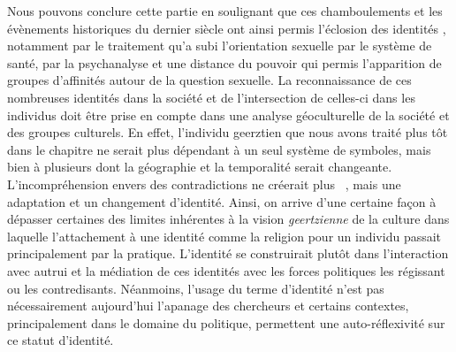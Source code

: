 Nous pouvons conclure cette partie en soulignant que ces chamboulements et les évènements historiques du dernier siècle ont ainsi permis l'éclosion des identités \lgbt{}, notamment par le traitement qu'a subi l'orientation sexuelle par le système de santé, par la psychanalyse et une distance du pouvoir qui permis l'apparition de groupes d'affinités autour de la question sexuelle. 
La reconnaissance de ces nombreuses identités dans la société et de l'intersection de celles-ci dans les individus doit être prise en compte dans une analyse géoculturelle de la société et des groupes culturels.
En effet, l'individu geerztien que nous avons traité plus tôt dans le chapitre ne serait plus dépendant à un seul système de symboles, mais bien à plusieurs dont la géographie et la temporalité serait changeante.
L'incompréhension envers des contradictions ne créerait plus ~\citep[33]{Geertz1972}, mais une adaptation et un changement d'identité.
Ainsi, on arrive d'une certaine façon à dépasser certaines des limites inhérentes à la vision \emph{geertzienne} de la culture dans laquelle l'attachement à une identité comme la religion pour un individu passait principalement par la pratique.
L'identité se construirait plutôt dans l'interaction avec autrui et la médiation de ces identités avec les forces politiques les régissant ou les contredisants.
Néanmoins, l'usage du terme d'identité n'est pas nécessairement aujourd'hui l'apanage des chercheurs et certains contextes, principalement dans le domaine du politique, permettent une auto-réflexivité sur ce statut d'identité.

